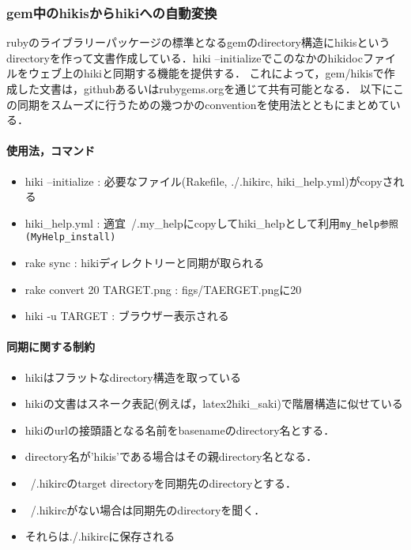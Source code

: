\subsubsection{gem中のhikisからhikiへの自動変換}
rubyのライブラリーパッケージの標準となるgemのdirectory構造にhikisというdirectoryを作って文書作成している．hiki --initializeでこのなかのhikidocファイルをウェブ上のhikiと同期する機能を提供する．
これによって，gem/hikisで作成した文書は，githubあるいはrubygems.orgを通じて共有可能となる．
以下にこの同期をスムーズに行うための幾つかのconventionを使用法とともにまとめている．

\paragraph{使用法，コマンド}
\begin{itemize}
\item hiki --initialize : 必要なファイル(Rakefile, ./.hikirc, hiki\_help.yml)がcopyされる
\item hiki\_help.yml : 適宜~/.my\_helpにcopyしてhiki\_helpとして利用\verb|my_help参照(MyHelp_install)|
\item rake sync : hikiディレクトリーと同期が取られる
\item rake convert 20 TARGET.png : figs/TAERGET.pngに20%
\item hiki -u TARGET : ブラウザー表示される
\end{itemize}
\paragraph{同期に関する制約}
\begin{itemize}
\item hikiはフラットなdirectory構造を取っている
\item hikiの文書はスネーク表記(例えば，latex2hiki\_saki)で階層構造に似せている
\item hikiのurlの接頭語となる名前をbasenameのdirectory名とする．
\item directory名が'hikis'である場合はその親directory名となる．
\item ~/.hikircのtarget directoryを同期先のdirectoryとする．
\item ~/.hikircがない場合は同期先のdirectoryを聞く．
\item それらは./.hikircに保存される
\end{itemize}
